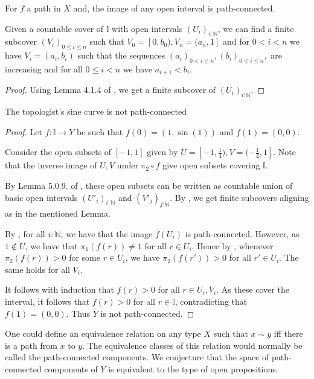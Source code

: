 \documentclass{../util/zariski}
\begin{document}
\begin{remark}\label{imageOpenPathConnected}
  For $f$ a path in $X$ and, the image of any open interval is path-connected. 
\end{remark}

\begin{lemma}\label{niceIntervalCover}
  Given a countable cover  of $\mathbb I$ with open intervals $(U_i)_{i:\mathbb N}$, 
  we can find a finite subcover $(V_i)_{0\leq i \leq n}$ 
  such that $V_0 = [0,b_0), V_n = (a_n, 1]$ and for $0<i<n$ we have $V_i = (a_i, b_i)$ 
  such that the sequences 
  $
  (a_i)_{0<i\leq n} , (b_i)_{0\leq i \leq n}, 
  $
  are increasing and for all $0\leq i < n$ we have 
  $a_{i+1}<b_i$. 
\end{lemma}
\begin{proof}
  Using Lemma 4.1.4 of \cite{synthetic-stone-duality}, 
  we get a finite subcover of $(U_i)_{i:\mathbb N}$. 
\end{proof}





\begin{theorem}
  The topologist's sine curve is not path-connected
\end{theorem}
\begin{proof}
  Let $f:\mathbb I \to Y$ be such that 
  $f(0) = (1,\sin(1))$ and 
  $f(1) = (0,0)$. 
  
  Consider the open subsets of $[-1,1]$ given by 
  $U = [-1, \frac14), V = (-\frac14, 1]$. 
  Note that the inverse image of $U,V$ under $\pi_2 \circ f$ give open subsets covering $\mathbb I$.
  
  By Lemma 5.0.9. of \cite{synthetic-stone-duality}, these open subsets 
  can be written as countable union of basic open intervals 
  $(U'_i)_{i:\mathbb N}$ and $(V'_j)_{j:\mathbb N}$. 
  By , we get finite subcovers aligning as in the mentioned Lemma. 

  By , for all $i:\mathbb N$, 
  we have that the image $f(U_i)$ is path-connected. 
  However, as $1\notin U$, we have that $\pi_1(f(r))\neq 1$ for all $r\in U_i$. 
  Hence by , 
  whenever $\pi_2(f(r))>0$ for some $r\in U_i$, we have $\pi_2(f(r'))>0$ for all $r'\in U_i$. 
  The same holds for all $V_i$. 

  It follows with induction that $f(r)>0$ for all $r\in U_i, V_i$.
  As these cover the interval, it follows that $f(r) >0$ for all $r\in \mathbb I$, 
  contradicting that $f(1) = (0,0)$. 
  Thus $Y$ is not path-connected. 
\end{proof}
\begin{remark}
  One could define an equivalence relation on any type $X$ such that 
  $x\sim y$ iff there is a path from $x$ to $y$. 
  The equivalence classes of this relation would normally be called the path-connected components. 
  We conjecture that the space of path-connected components of $Y$ is equivalent to the type of open propositions. 
\end{remark}
\end{document}
